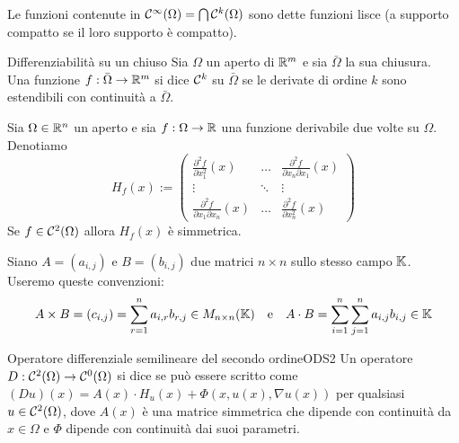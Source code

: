 \documentclass{book}
\begin{document}
\begin{definition}{}{}
    Le funzioni contenute in $\mathcal{C}^\infty(\Omega) = \bigcap \mathcal{C}^k(\Omega)$ sono dette funzioni lisce (a supporto compatto se il loro supporto è compatto). 
\end{definition}

\begin{definition}{Differenziabilità su un chiuso}{}
    Sia $\Omega$ un aperto di $\mathbb{R}^m$ e sia $\bar{\Omega}$ la sua chiusura.\\
    Una funzione $f:\bar{\Omega}\to\mathbb{R}^m$ si dice $\mathcal{C}^k$ su $\bar{\Omega}$ se le derivate di ordine $k$ sono estendibili con continuità a $\bar{\Omega}$.
\end{definition}

\begin{notation}
    Sia $\Omega \in \mathbb{R}^n$ un aperto e sia $f:\Omega \to \mathbb{R}$ una funzione derivabile due volte su $\Omega$. Denotiamo
    \[H_f(x):=\begin{pmatrix}
        \frac{\partial^2 f}{\partial x_1^2}(x) &\dots & \frac{\partial^2 f}{\partial x_n\partial x_1}(x)\\
        \vdots & \ddots & \vdots \\
        \frac{\partial^2 f}{\partial x_1\partial x_n}(x) &\dots & \frac{\partial^2 f}{\partial x_n^2}(x)
    \end{pmatrix}\]
    Se $f \in \mathcal{C}^2(\Omega)$ allora $H_f(x)$ è simmetrica.
\end{notation}

\begin{notation}
    Siano $A = (a_{i,j})$ e $B = (b_{i,j})$ due matrici $n\times n$ sullo stesso campo $\mathbb{K}$. Useremo queste convenzioni:
    \[A\times B = (c_{i,j}) = \sum_{r=1}^{n} a_{i,r} b_{r,j} \in M_{n\times n}(\mathbb{K}) \quad \text{e} \quad A\cdot B = \sum_{i = 1}^{n} \sum_{j=1}^{n} a_{i,j} b_{i,j} \in \mathbb{K}\]
\end{notation}


\begin{definition}{Operatore differenziale semilineare del secondo ordine}{ODS2}
    Un operatore $D:\mathcal{C}^2(\Omega) \to \mathcal{C}^0(\Omega)$ si dice  se può essere scritto come $(Du)(x) = A(x)\cdot H_u(x) + \Phi(x,u(x), \nabla u(x))$ per qualsiasi $u \in \mathcal{C}^2(\Omega)$, dove $A(x)$ è una matrice simmetrica che dipende con continuità da $x\in\Omega$ e $\Phi$ dipende con continuità dai suoi parametri.
\end{definition}
\end{document}

